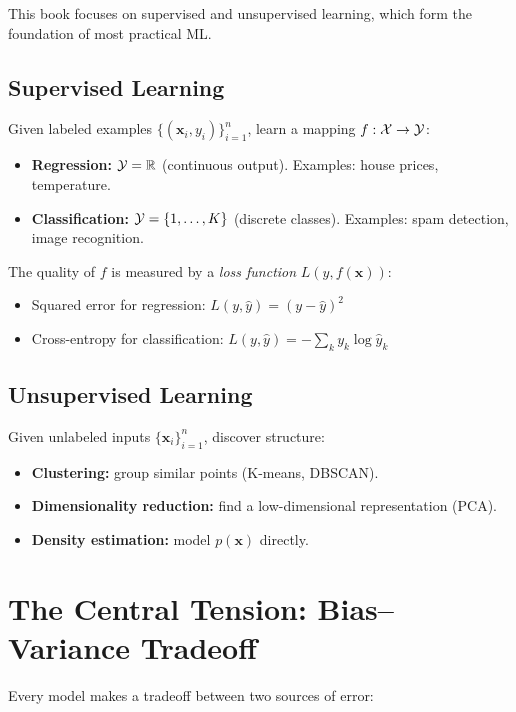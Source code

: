 This book focuses on supervised and unsupervised learning, which form the foundation of most practical ML.

\subsection{Supervised Learning}

Given labeled examples $\{(\mathbf{x}_i, y_i)\}_{i=1}^n$, learn a mapping $f: \mathcal{X} \to \mathcal{Y}$:

\begin{itemize}
	\item \textbf{Regression:} $\mathcal{Y} = \mathbb{R}$ (continuous output). Examples: house prices, temperature.
	\item \textbf{Classification:} $\mathcal{Y} = \{1, \dots, K\}$ (discrete classes). Examples: spam detection, image recognition.
\end{itemize}

The quality of $f$ is measured by a \emph{loss function} $L(y, f(\mathbf{x}))$:

\begin{itemize}
	\item Squared error for regression: $L(y, \hat{y}) = (y - \hat{y})^2$
	\item Cross-entropy for classification: $L(y, \hat{y}) = -\sum_{k} y_k \log \hat{y}_k$
\end{itemize}

\subsection{Unsupervised Learning}

Given unlabeled inputs $\{\mathbf{x}_i\}_{i=1}^n$, discover structure:

\begin{itemize}
	\item \textbf{Clustering:} group similar points (K-means, DBSCAN).
	\item \textbf{Dimensionality reduction:} find a low-dimensional representation (PCA).
	\item \textbf{Density estimation:} model $p(\mathbf{x})$ directly.
\end{itemize}

\section{The Central Tension: Bias--Variance Tradeoff}

Every model makes a tradeoff between two sources of error:

